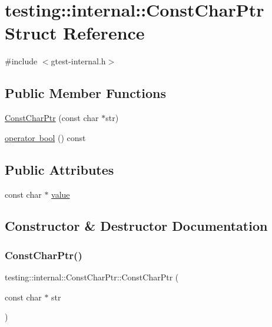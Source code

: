 \hypertarget{structtesting_1_1internal_1_1_const_char_ptr}{}\section{testing\+::internal\+::Const\+Char\+Ptr Struct Reference}
\label{structtesting_1_1internal_1_1_const_char_ptr}


{\ttfamily \#include $<$gtest-\/internal.\+h$>$}

\subsection*{Public Member Functions}
\begin{DoxyCompactItemize}
\item 
\mbox{\hyperlink{structtesting_1_1internal_1_1_const_char_ptr_ae94f6453fa679d815994eccc63062907}{Const\+Char\+Ptr}} (const char $\ast$str)
\item 
\mbox{\hyperlink{structtesting_1_1internal_1_1_const_char_ptr_a85c8174b5d4db8fe96863509ba767b27}{operator bool}} () const
\end{DoxyCompactItemize}
\subsection*{Public Attributes}
\begin{DoxyCompactItemize}
\item 
const char $\ast$ \mbox{\hyperlink{structtesting_1_1internal_1_1_const_char_ptr_adba40d23d5986904b605946f643cf26e}{value}}
\end{DoxyCompactItemize}


\subsection{Constructor \& Destructor Documentation}
\mbox{\label{structtesting_1_1internal_1_1_const_char_ptr_ae94f6453fa679d815994eccc63062907}} 
\subsubsection{\texorpdfstring{ConstCharPtr()}{ConstCharPtr()}}
{\footnotesize\ttfamily testing\+::internal\+::\+Const\+Char\+Ptr\+::\+Const\+Char\+Ptr (\begin{DoxyParamCaption}\item[{const char $\ast$}]{str }\end{DoxyParamCaption})\hspace{0.3cm}{\ttfamily [inline]}}




